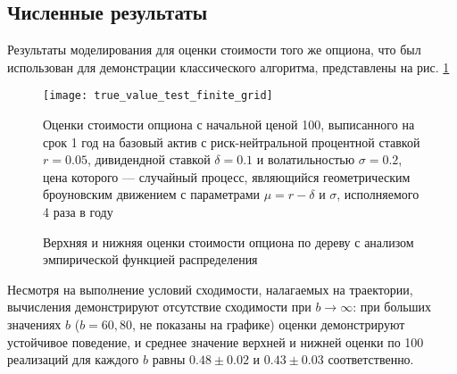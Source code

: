 	        \subsection{Численные результаты}
	            Результаты моделирования для оценки стоимости того же опциона, что был использован для демонстрации классического алгоритма, представлены на рис. \ref{fig:true_value_test_finite_grid}
                \begin{figure}[h]
                    \centering
                    \texttt{[image: true\_value\_test\_finite\_grid]}
                    \caption{Верхняя и нижняя оценки стоимости опциона по дереву с анализом эмпирической функцией распределения}
                    \label{fig:true_value_test_finite_grid}
                    \footnotesize{Оценки стоимости опциона с начальной ценой 100, выписанного на срок 1 год на базовый актив с риск-нейтральной процентной ставкой $r = 0.05$, дивидендной ставкой $\delta = 0.1$ и волатильностью $\sigma=0.2$, цена которого --- случайный процесс, являющийся геометрическим броуновским движением с параметрами $\mu = r - \delta$ и $\sigma$, исполняемого 4 раза в году}
                \end{figure}
                Несмотря на выполнение условий сходимости, налагаемых на траектории, вычисления демонстрируют отсутствие сходимости при $b \to \infty$: при больших значениях $b$ ($b=60, 80$, не показаны на графике) оценки демонстрируют устойчивое поведение, и среднее значение верхней и нижней оценки по 100 реализаций для каждого $b$ равны $0.48\pm 0.02$ и $0.43\pm 0.03$ соответственно.